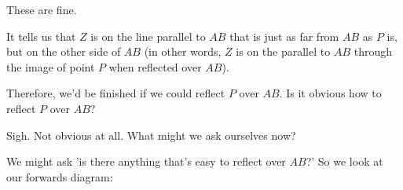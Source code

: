 







These are fine. 

It tells us that $Z$ is on the line parallel to $AB$ that is just as far from $AB$ as $P$ is, but on the other side of $AB$ (in other words, $Z$ is on the parallel to $AB$ through the image of point $P$ when reflected over $AB$).

Therefore, we'd be finished if we could reflect $P$ over $AB$. Is it obvious how to reflect $P$ over $AB?$


Sigh. Not obvious at all. What might we ask ourselves now?

We might ask 'is there anything that's easy to reflect over $AB$?'  So we look at our forwards diagram:




